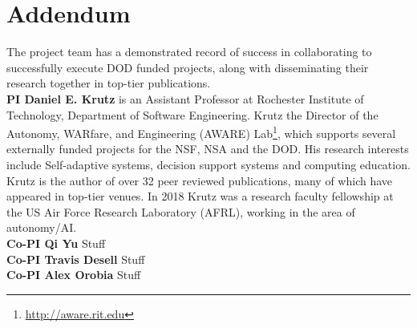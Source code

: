 
\section*{Addendum} %


\newcommand{\AuthorInfo}[3]{\noindent \textbf{#1  #2} #3}



The project team has a demonstrated record of success in collaborating to successfully execute DOD funded projects, along with disseminating their research together in top-tier publications.\\

\AuthorInfo{PI}{Daniel E. Krutz}{is an Assistant Professor at Rochester Institute of Technology, Department of Software Engineering. Krutz the Director of the Autonomy, WARfare, and Engineering (AWARE) Lab\footnote{\url{http://aware.rit.edu}}, which supports several externally funded projects for the NSF, NSA and the DOD. His research interests include Self-adaptive systems, decision support systems and computing education. Krutz is the author of over 32 peer reviewed publications, many of which have appeared in top-tier venues. In 2018 Krutz was a research faculty fellowship at the US Air Force Research Laboratory (AFRL), working in the area of autonomy/AI.}\\


\AuthorInfo{Co-PI}{Qi Yu}{Stuff}\\


\AuthorInfo{Co-PI}{Travis Desell}{Stuff}\\


\AuthorInfo{Co-PI}{Alex Orobia}{Stuff}




